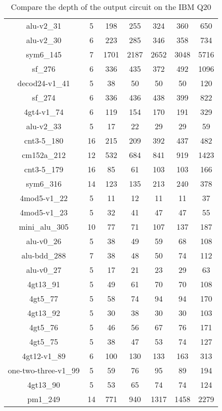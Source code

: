 \documentclass[runningheads]{llncs}
\begin{document}
\begin{table}[H]
\begin{center}
\begin{tabular}{|c|c|c|c|c|c|c|}
							alu-v2\_31 & 5 & 198 & 255 & 324 & 360 & 650 \\
							alu-v2\_30 & 6 & 223 & 285 & 346 & 358 & 734 \\
							sym6\_145 & 7 & 1701 & 2187 & 2652 & 3048 & 5716 \\
							sf\_276 & 6 & 336 & 435 & 372 & 492 & 1096 \\
							decod24-v1\_41 & 5 & 38 & 50 & 50 & 50 & 120 \\
							sf\_274 & 6 & 336 & 436 & 438 & 399 & 822 \\
							4gt4-v1\_74 & 6 & 119 & 154 & 170 & 191 & 329 \\
							alu-v2\_33 & 5 & 17 & 22 & 29 & 29 & 59 \\
							cnt3-5\_180 & 16 & 215 & 209 & 392 & 437 & 482 \\
							cm152a\_212 & 12 & 532 & 684 & 841 & 919 & 1423 \\
							cnt3-5\_179 & 16 & 85 & 61 & 103 & 103 & 166 \\
							sym6\_316 & 14 & 123 & 135 & 213 & 240 & 378 \\
							4mod5-v1\_22 & 5 & 11 & 12 & 11 & 11 & 37 \\
							4mod5-v1\_23 & 5 & 32 & 41 & 47 & 47 & 55 \\
							mini\_alu\_305 & 10 & 77 & 71 & 107 & 137 & 187 \\
							alu-v0\_26 & 5 & 38 & 49 & 59 & 68 & 108 \\
							alu-bdd\_288 & 7 & 38 & 48 & 50 & 74 & 112 \\
							alu-v0\_27 & 5 & 17 & 21 & 23 & 29 & 63 \\
							4gt13\_91 & 5 & 49 & 61 & 70 & 70 & 108 \\
							4gt5\_77 & 5 & 58 & 74 & 94 & 94 & 170 \\
							4gt13\_92 & 5 & 30 & 38 & 30 & 30 & 103 \\
							4gt5\_76 & 5 & 46 & 56 & 67 & 76 & 171 \\
							4gt5\_75 & 5 & 38 & 47 & 53 & 74 & 127 \\
							4gt12-v1\_89 & 6 & 100 & 130 & 133 & 163 & 313 \\
							one-two-three-v1\_99 & 5 & 59 & 76 & 95 & 89 & 194 \\
							4gt13\_90 & 5 & 53 & 65 & 74 & 74 & 124 \\
							pm1\_249 & 14 & 771 & 940 & 1317 & 1458 & 2279 \\
						\hline
							\end{tabular} 
							\end{center} 
							\caption{Compare the depth of the output circuit on the IBM Q20} 
							\label{tab7}	
						\end{table}
\end{document}
